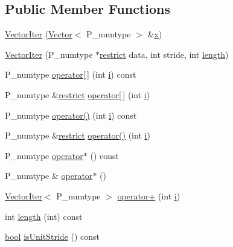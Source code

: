 \subsection*{Public Member Functions}
\begin{DoxyCompactItemize}
\item 
\hyperlink{classVectorIter_a56cff4862da53097bb06af61862d7145}{Vector\+Iter} (\hyperlink{classVector}{Vector}$<$ P\+\_\+numtype $>$ \&\hyperlink{vecnorm1_8cc_ac73eed9e41ec09d58f112f06c2d6cb63}{x})
\item 
\hyperlink{classVectorIter_af2234e12465ae68ed43716f3531b1cb7}{Vector\+Iter} (P\+\_\+numtype $\ast$\hyperlink{compiler_8h_a080abdcb9c02438f1cd2bb707af25af8}{restrict} data, int stride, int \hyperlink{classVectorIter_a5994dbca68413be18704c7a0c82389cc}{length})
\item 
P\+\_\+numtype \hyperlink{classVectorIter_a44896fa2adb8bbc46125aae3678923b4}{operator\mbox{[}$\,$\mbox{]}} (int \hyperlink{indexexpr_8h_aabd77643995707c185e95c8cb2782c81}{i}) const 
\item 
P\+\_\+numtype \&\hyperlink{compiler_8h_a080abdcb9c02438f1cd2bb707af25af8}{restrict} \hyperlink{classVectorIter_aba8bbbc7b7d300560aff4cc9b57aebc3}{operator\mbox{[}$\,$\mbox{]}} (int \hyperlink{indexexpr_8h_aabd77643995707c185e95c8cb2782c81}{i})
\item 
P\+\_\+numtype \hyperlink{classVectorIter_ad45e6883c4c2827df13586aa1c8594d0}{operator()} (int \hyperlink{indexexpr_8h_aabd77643995707c185e95c8cb2782c81}{i}) const 
\item 
P\+\_\+numtype \&\hyperlink{compiler_8h_a080abdcb9c02438f1cd2bb707af25af8}{restrict} \hyperlink{classVectorIter_a22ad3c8c495b19a258493e8b660080db}{operator()} (int \hyperlink{indexexpr_8h_aabd77643995707c185e95c8cb2782c81}{i})
\item 
P\+\_\+numtype \hyperlink{classVectorIter_adcc9aee3c2ca699089de6f0f03402522}{operator$\ast$} () const 
\item 
P\+\_\+numtype \& \hyperlink{classVectorIter_ae931daa256977fe04db917c74caa021a}{operator$\ast$} ()
\item 
\hyperlink{classVectorIter}{Vector\+Iter}$<$ P\+\_\+numtype $>$ \hyperlink{classVectorIter_af0a355b623fd9c83781c93d1426309af}{operator+} (int \hyperlink{indexexpr_8h_aabd77643995707c185e95c8cb2782c81}{i})
\item 
int \hyperlink{classVectorIter_a5994dbca68413be18704c7a0c82389cc}{length} (int) const 
\item 
\hyperlink{compiler_8h_abb452686968e48b67397da5f97445f5b}{bool} \hyperlink{classVectorIter_a988c106e3d456f9b1690066d38077230}{is\+Unit\+Stride} () const 

\end{DoxyCompactItemize}
